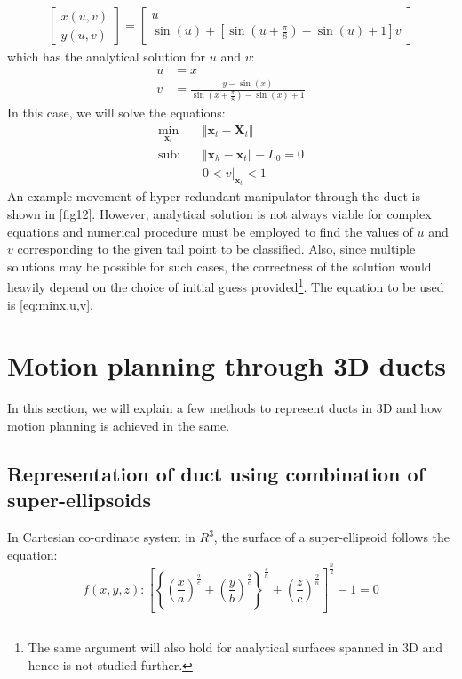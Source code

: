 \documentclass[12pt,a4]{article}
\begin{document}
\begin{align}
\begin{bmatrix}
x(u,v)\\y(u,v)
\end{bmatrix} = 
\begin{bmatrix}
u\\\sin\left(u\right)+\left[\sin\left(u+\frac{\pi}{8}\right)-\sin\left(u\right)+1 \right]v
\end{bmatrix}
\end{align}
which has the analytical solution for $u$ and $v$:
\begin{align*}
u &= x\\
v &= \frac{y-\sin\left(x\right)}{\sin\left(x+\frac{\pi}{8}\right)-\sin\left(x\right)+1}
\end{align*}
In this case, we will solve the equations:
\begin{align}
\label{eq:analy2D}
\min_{\textbf{x}_t} &\Vert \textbf{x}_t-\textbf{X}_t \Vert\\
\nonumber \text{sub:~~~} &\Vert \textbf{x}_h - \textbf{x}_t \Vert -L_0 = 0\\
&0< v\vert_{\mathbf{x}_t}< 1
\end{align} 
 An example movement of hyper-redundant manipulator through the duct is shown in [fig12]. However, analytical solution is not always viable for complex equations and numerical procedure must be employed to find the values of $u$ and $v$ corresponding to the given tail point to be classified. Also, since multiple solutions may be possible for such cases, the correctness of the solution would heavily depend on the choice of initial guess provided\footnote{The same argument will also hold for analytical surfaces spanned in 3D and hence is not studied further.}. The equation to be used is \ref{eq:minx,u,v}.

\section{Motion planning through 3D ducts}
\label{sec:3Dmotionplanning}
In this section, we will explain a few methods to represent ducts in 3D and how motion planning is achieved in the same.
\subsection{Representation of duct using combination of super-ellipsoids}
In Cartesian co-ordinate system in $R^3$, the surface of a super-ellipsoid follows the equation:
\begin{equation}
f(x,y,z) : \left[ \left\lbrace \left(\frac{x}{a} \right)^{\frac 2e} +\left(\frac{y}{b} \right)^{\frac 2e} \right\rbrace^{\frac{e}{n}} +\left(\frac{z}{c} \right)^{\frac 2n}  \right]^\frac n2-1 =0
\end{equation}
\end{document}

